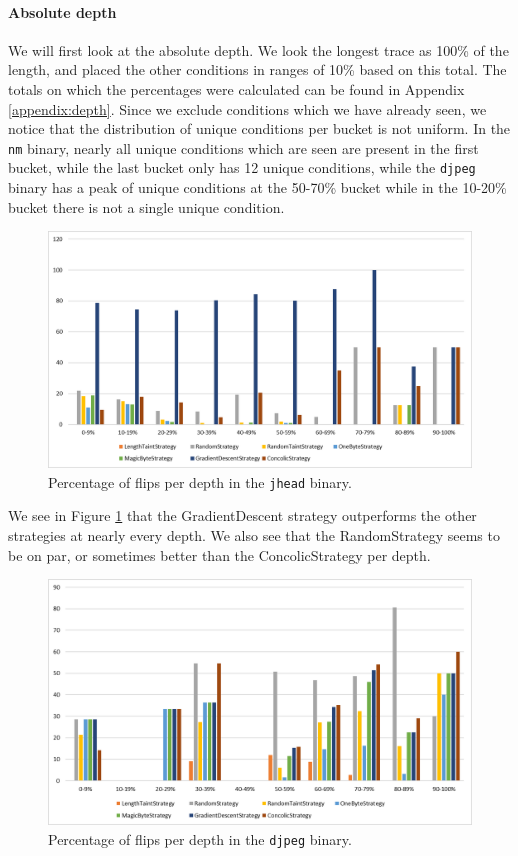 \paragraph{Absolute depth}
We will first look at the absolute depth. We look the longest trace as 100\% of the length, and placed the other conditions in ranges of 10\% based on this total.
The totals on which the percentages were calculated can be found in Appendix \ref{appendix:depth}. Since we exclude conditions which we have already seen, we notice that the distribution of unique conditions per bucket is not uniform. In the \texttt{nm} binary, nearly all unique conditions which are seen are present in the first bucket, while the last bucket only has 12 unique conditions, while the \texttt{djpeg} binary has a peak of unique conditions at the 50-70\% bucket while in the 10-20\% bucket there is not a single unique condition.
\begin{figure}[H]
    \centering
    \includegraphics[width=.8\linewidth]{5_results/graphs/jhead-depth.png}  
    \caption{Percentage of flips per depth in the \texttt{jhead} binary.}
    \label{fig:jheadDepth}
\end{figure}
We see  in Figure \ref{fig:jheadDepth} that the GradientDescent strategy outperforms the other strategies at nearly every depth. We also see that the RandomStrategy seems to be on par, or sometimes better than the ConcolicStrategy per depth.
\begin{figure}[H]
    \centering
    \includegraphics[width=.8\linewidth]{5_results/graphs/djpeg-depth.png}  
    \caption{Percentage of flips per depth in the \texttt{djpeg} binary.}
    \label{fig:djpegDepth}
\end{figure}
